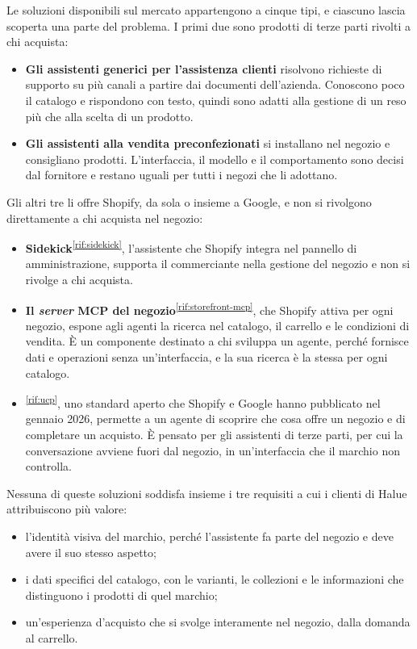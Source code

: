 Le soluzioni disponibili sul mercato appartengono a cinque tipi, e ciascuno lascia scoperta una
parte del problema. I primi due sono prodotti di terze parti rivolti a chi acquista:

\begin{itemize}
	\item \textbf{Gli assistenti generici per l’assistenza clienti} risolvono richieste di supporto
	su più canali a partire dai documenti dell’azienda. Conoscono poco il catalogo e rispondono con
	testo, quindi sono adatti alla gestione di un reso più che alla scelta di un prodotto.
	\item \textbf{Gli assistenti alla vendita preconfezionati} si installano nel negozio e
	consigliano prodotti. L’interfaccia, il modello e il comportamento sono decisi dal fornitore e
	restano uguali per tutti i negozi che li adottano.
\end{itemize}

Gli altri tre li offre Shopify, da sola o insieme a Google, e non si rivolgono direttamente a chi
acquista nel negozio:

\begin{itemize}
	\item \textbf{Sidekick}\textsuperscript{\ref{rif:sidekick}}, l’assistente che Shopify integra nel
	pannello di amministrazione, supporta il commerciante nella gestione del negozio e non si
	rivolge a chi acquista.
	\item \textbf{Il \emph{server} MCP del negozio}\textsuperscript{\ref{rif:storefront-mcp}}, che
	Shopify attiva per ogni negozio, espone agli agenti la ricerca nel catalogo, il carrello e le
	condizioni di vendita. È un componente destinato a chi sviluppa un agente, perché fornisce dati
	e operazioni senza un’interfaccia, e la sua ricerca è la stessa per ogni catalogo.
	\item \textbf{}\textsuperscript{\ref{rif:ucp}}, uno standard aperto che Shopify
	e Google hanno pubblicato nel gennaio 2026, permette a un agente di scoprire che cosa offre un
	negozio e di completare un acquisto. È pensato per gli assistenti di terze parti, per cui la
	conversazione avviene fuori dal negozio, in un’interfaccia che il marchio non controlla.
\end{itemize}

Nessuna di queste soluzioni soddisfa insieme i tre requisiti a cui i clienti di Halue attribuiscono
più valore:

\begin{itemize}
	\item l’identità visiva del marchio, perché l’assistente fa parte del negozio e deve avere il suo
	stesso aspetto;
	\item i dati specifici del catalogo, con le varianti, le collezioni e le informazioni che
	distinguono i prodotti di quel marchio;
	\item un’esperienza d’acquisto che si svolge interamente nel negozio, dalla domanda al carrello.
\end{itemize}

